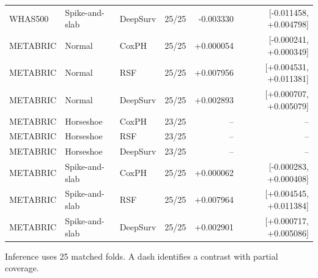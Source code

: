 \begin{longtable}{@{}lllr r r@{}}
WHAS500 & Spike-and-slab & DeepSurv & 25/25 & -0.003330 & [-0.011458, +0.004798] \\
METABRIC & Normal & CoxPH & 25/25 & +0.000054 & [-0.000241, +0.000349] \\
METABRIC & Normal & RSF & 25/25 & +0.007956 & [+0.004531, +0.011381] \\
METABRIC & Normal & DeepSurv & 25/25 & +0.002893 & [+0.000707, +0.005079] \\
METABRIC & Horseshoe & CoxPH & 23/25 & -- & -- \\
METABRIC & Horseshoe & RSF & 23/25 & -- & -- \\
METABRIC & Horseshoe & DeepSurv & 23/25 & -- & -- \\
METABRIC & Spike-and-slab & CoxPH & 25/25 & +0.000062 & [-0.000283, +0.000408] \\
METABRIC & Spike-and-slab & RSF & 25/25 & +0.007964 & [+0.004545, +0.011384] \\
METABRIC & Spike-and-slab & DeepSurv & 25/25 & +0.002901 & [+0.000717, +0.005086] \\
\end{longtable}
\noindent Inference uses 25 matched folds. A dash identifies a contrast with partial coverage.\par\endgroup
